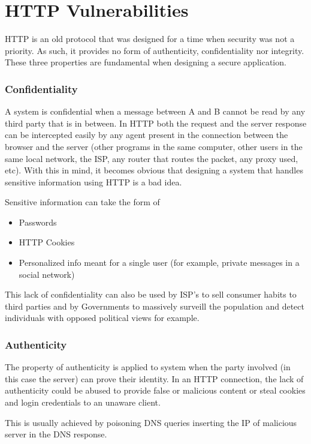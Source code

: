 \section{HTTP Vulnerabilities}
HTTP is an old protocol that was designed for a time when security was not a priority. As such, it provides no form of authenticity, confidentiality nor integrity. These three properties are fundamental when designing a secure application.	

\subsubsection{Confidentiality}
A system is confidential when a message between A and B cannot be read by any third party that is in between. In HTTP both the request and the server response can be intercepted easily by any agent present in the connection between the browser and the server (other programs in the same computer, other users in the same local network, the ISP, any router that routes the packet, any proxy used, etc). With this in mind, it becomes obvious that designing a system that handles sensitive information using HTTP is a bad idea.

Sensitive information can take the form of
\begin{itemize}
	\item Passwords
	\item HTTP Cookies
	\item Personalized info meant for a single user (for example, private messages in a social network)
\end{itemize}

This lack of confidentiality can also be used by ISP's to sell consumer habits to third parties and by Governments to massively surveill the population and detect individuals with opposed political views for example.

\subsubsection{Authenticity}
The property of authenticity is applied to system when the party involved (in this case the server) can prove their identity. In an HTTP connection, the lack of authenticity could be abused to provide false or malicious content or steal cookies and login credentials to an unaware client. 

This is usually achieved by poisoning DNS queries inserting the IP of malicious server in the DNS response.


